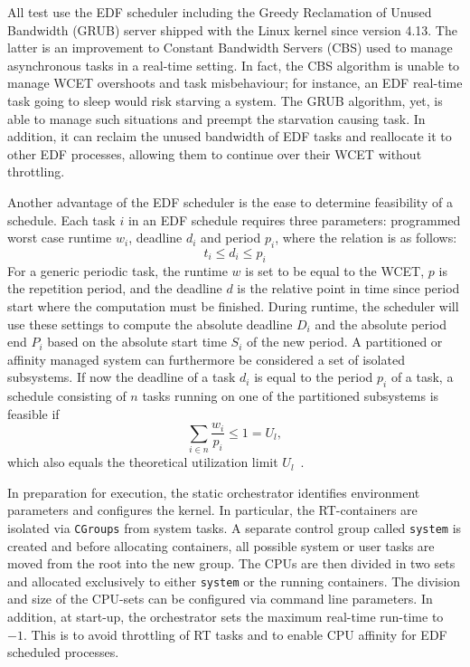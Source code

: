 \documentclass[]{scrartcl}
\begin{document}
All test use the EDF scheduler including the Greedy Reclamation of Unused Bandwidth (GRUB) server shipped with the Linux kernel since version 4.13.
The latter is an improvement to Constant Bandwidth Servers (CBS) used to manage asynchronous tasks in a real-time setting. 
In fact, the CBS algorithm is unable to manage WCET overshoots and task misbehaviour; for instance, an EDF real-time task going to sleep would risk starving a system. 
The GRUB algorithm, yet, is able to manage such situations and preempt the starvation causing task. 
In addition, it can reclaim the unused bandwidth of EDF tasks and reallocate it to other EDF processes, allowing them to continue over their WCET without throttling.

Another advantage of the EDF scheduler is the ease to determine feasibility of a schedule.
Each task $i$ in an EDF schedule requires three parameters: programmed worst case runtime $w_i$, deadline $d_i$ and period $p_i$, where the relation is as follows:
\begin{equation}
t_i \le d_i \le p_i
\end{equation}
For a generic periodic task, the runtime $w$ is set to be equal to the WCET, $p$ is the repetition period, and the deadline $d$ is the relative point in time since period start where the computation must be finished. 
During runtime, the scheduler will use these settings to compute the absolute deadline $D_i$ and the absolute period end $P_i$ based on the absolute start time $S_i$ of the new period.
A partitioned or affinity managed system can furthermore be considered a set of isolated subsystems.
If now the deadline of a task $d_i$ is equal to the period $p_i$ of a task, a schedule consisting of $n$ tasks running on one of the partitioned subsystems is feasible if
\begin{equation}
\sum_{i \in n} \frac{w_i}{p_i} \le 1 = U_l,
\end{equation}
which also equals the theoretical utilization limit $U_l$~\cite{Buttazzo2011}. 

In preparation for execution, the static orchestrator identifies environment parameters and configures the kernel.
In particular, the RT-containers are isolated via %
\texttt{CGroups} from system tasks.
A separate control group called \texttt{system} is created and before allocating containers, all possible system or user tasks are moved from the root into the new group.
The CPUs are then divided in two sets and allocated exclusively to either \texttt{system} or the running containers.
The division and size of the CPU-sets can be configured via command line parameters.
In addition, at start-up, the orchestrator sets the maximum real-time run-time to $-1$. This is to avoid throttling of RT tasks and to enable CPU affinity for EDF scheduled processes.
\end{document}
